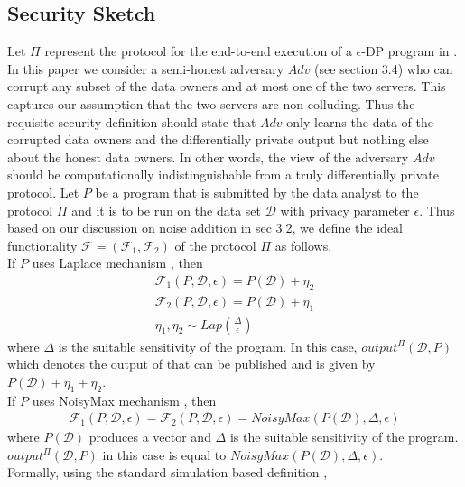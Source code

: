 \subsection{\system Security Sketch}
 Let $\Pi$ represent the protocol for the end-to-end execution of a $\epsilon$-DP program in \system.  In this paper we consider a
semi-honest adversary  $Adv$ (see section 3.4) who can corrupt any subset of the data owners and at most one of the two
servers. This captures our assumption that the two servers are non-colluding. Thus the requisite security definition should state that $Adv$ only learns the data of the corrupted data owners and the  differentially private output but nothing else about the honest data owners. In other words, the view of the adversary $Adv$ should be computationally indistinguishable from a truly differentially private protocol. 
Let $P$ be a program that is submitted by the data analyst to the protocol $\Pi$ and it is to be run on the data set $\mathcal{D}$ with privacy parameter $\epsilon$. Thus based on our discussion on noise addition in sec 3.2, we define the ideal functionality $\mathcal{F}=(\mathcal{F}_1,\mathcal{F}_2)$ of the protocol $\Pi$ as follows.
\\If $P$ uses Laplace mechanism \cite{Dork}, then
\begin{gather} 
\mathcal{F}_1(P,\mathcal{D},\epsilon)=P(\mathcal{D})+\eta_2\\\mathcal{F}_2(P,\mathcal{D},\epsilon)=P(\mathcal{D})+\eta_1 \\ \eta_1, \eta_2 \sim Lap(\frac{\Delta}{\epsilon})\end{gather}  where  $\Delta$  is the suitable sensitivity of the program. In this case, $output^{\Pi}(\mathcal{D},P)$ which denotes the output of \system that can be published and is given by $P(\mathcal{D})+\eta_1+\eta_2$.\\
If $P$ uses NoisyMax mechanism \cite{Dork}, then
\begin{multline}
\mathcal{F}_1(P,\mathcal{D},\epsilon)=\mathcal{F}_2(P,\mathcal{D},\epsilon)=NoisyMax(P(\mathcal{D}),\Delta,\epsilon) 
\end{multline} where $P(\mathcal{D})$ produces a vector and  $\Delta$ is the suitable sensitivity of the program. $output^{\Pi}(\mathcal{D},P)$ in this case is equal to $NoisyMax(P(\mathcal{D}),\Delta,\epsilon)$.\\
Formally, using the standard simulation based definition \cite{Oded},
